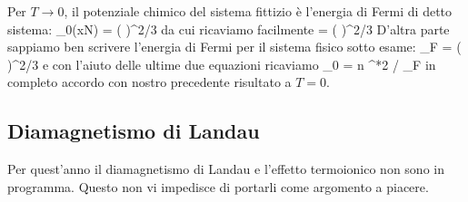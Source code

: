 Per $T\to 0$, il potenziale chimico del sistema fittizio è l'energia di Fermi di detto sistema:
\be
\mu_0(xN) =
\left(
\right)^{2/3}
\ee
da cui ricaviamo facilmente
\be
{} = 
\left(
\right)^{2/3}
\ee
D'altra parte sappiamo ben scrivere l'energia di Fermi per il sistema fisico sotto esame:
\be
\eps_F =
\left(
\right)^{2/3}
\ee
e con l'aiuto delle ultime due equazioni ricaviamo
\be
\chi_0 =  n \mu^{*2} / \eps_F
\ee
in completo accordo con nostro precedente risultato a $T = 0$. 

\subsection{Diamagnetismo di Landau}

Per quest'anno il diamagnetismo di Landau e l'effetto termoionico non sono in programma. Questo non vi impedisce di portarli come argomento a piacere.


